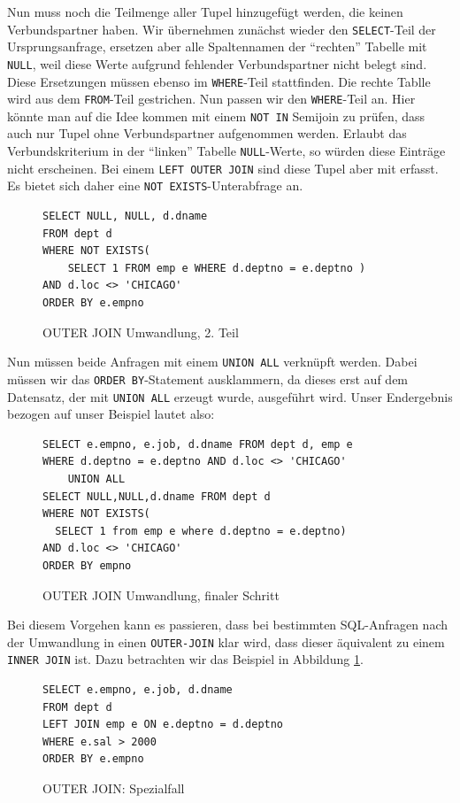 Nun muss noch die Teilmenge aller Tupel hinzugefügt werden, die keinen Verbundspartner haben. Wir übernehmen zunächst wieder den \verb|SELECT|-Teil der Ursprungsanfrage, ersetzen aber alle Spaltennamen der ``rechten'' Tabelle mit \verb|NULL|, weil diese Werte aufgrund fehlender Verbundspartner nicht belegt sind. Diese Ersetzungen müssen ebenso im \verb|WHERE|-Teil stattfinden. Die rechte Tablle wird aus dem \verb|FROM|-Teil gestrichen. Nun passen wir den \verb|WHERE|-Teil an. Hier könnte man auf die Idee kommen mit einem \verb|NOT IN| Semijoin zu prüfen, dass auch nur Tupel ohne Verbundspartner aufgenommen werden. Erlaubt  das Verbundskriterium in der ``linken'' Tabelle \verb|NULL|-Werte, so würden diese Einträge nicht erscheinen. Bei einem \verb|LEFT OUTER JOIN| sind diese Tupel aber mit erfasst. Es bietet sich daher eine \verb|NOT EXISTS|-Unterabfrage an. 

\begin{figure}[H]
\begin{verbatim}
SELECT NULL, NULL, d.dname
FROM dept d 
WHERE NOT EXISTS(
    SELECT 1 FROM emp e WHERE d.deptno = e.deptno )
AND d.loc <> 'CHICAGO'
ORDER BY e.empno
\end{verbatim}
\caption{OUTER JOIN Umwandlung, 2. Teil}
\end{figure}

Nun müssen beide Anfragen mit einem \verb|UNION ALL| verknüpft werden. Dabei müssen wir das \verb|ORDER BY|-Statement ausklammern, da dieses erst auf dem Datensatz, der mit \verb|UNION ALL| erzeugt wurde, ausgeführt wird. Unser Endergebnis bezogen auf unser Beispiel lautet also:

\begin{figure}[H]
\begin{verbatim}
SELECT e.empno, e.job, d.dname FROM dept d, emp e
WHERE d.deptno = e.deptno AND d.loc <> 'CHICAGO'
    UNION ALL
SELECT NULL,NULL,d.dname FROM dept d 
WHERE NOT EXISTS(
  SELECT 1 from emp e where d.deptno = e.deptno)
AND d.loc <> 'CHICAGO'
ORDER BY empno
\end{verbatim}
\caption{OUTER JOIN Umwandlung, finaler Schritt}
\end{figure}

Bei diesem Vorgehen kann es passieren, dass bei bestimmten SQL-Anfragen nach der Umwandlung in einen \verb|OUTER-JOIN| klar wird, dass dieser äquivalent zu einem \verb|INNER JOIN| ist. Dazu betrachten wir das Beispiel in Abbildung \ref{fig:outer_s1}.

\begin{figure}[H]
\begin{verbatim}
SELECT e.empno, e.job, d.dname 
FROM dept d 
LEFT JOIN emp e ON e.deptno = d.deptno 
WHERE e.sal > 2000
ORDER BY e.empno
\end{verbatim}
\caption{OUTER JOIN: Spezialfall}
\label{fig:outer_s1}
\end{figure}

